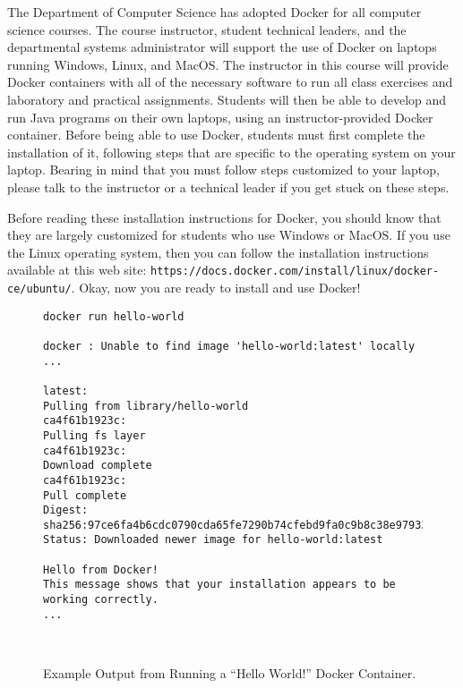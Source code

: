 \documentclass[11pt]{article}
\newcommand{\url}[1]{\lstinline{#1}}
\begin{document}
The Department of Computer Science has adopted Docker for all computer science
courses. The course instructor, student technical leaders, and the departmental
systems administrator will support the use of Docker on laptops running
Windows, Linux, and MacOS. The instructor in this course will provide Docker
containers with all of the necessary software to run all class exercises and
laboratory and practical assignments. Students will then be able to develop and
run Java programs on their own laptops, using an instructor-provided Docker
container. Before being able to use Docker, students must first complete the
installation of it, following steps that are specific to the operating system
on your laptop. Bearing in mind that you must follow steps customized to your
laptop, please talk to the instructor or a technical leader if you get stuck on
these steps.

Before reading these installation instructions for Docker, you should know that
they are largely customized for students who use Windows or MacOS. If you use
the Linux operating system, then you can follow the installation instructions
available at this web site:
\url{https://docs.docker.com/install/linux/docker-ce/ubuntu/}. Okay, now you are
ready to install and use Docker!

\begin{figure}

\begin{verbatim}
docker run hello-world

docker : Unable to find image 'hello-world:latest' locally
...

latest:
Pulling from library/hello-world
ca4f61b1923c:
Pulling fs layer
ca4f61b1923c:
Download complete
ca4f61b1923c:
Pull complete
Digest: sha256:97ce6fa4b6cdc0790cda65fe7290b74cfebd9fa0c9b8c38e979330d547d22ce1
Status: Downloaded newer image for hello-world:latest

Hello from Docker!
This message shows that your installation appears to be working correctly.
...
\end{verbatim}

\vspace*{-.25in}
\caption{Example Output from Running a ``Hello World!''  Docker Container.}~\label{fig:docker}
\vspace*{-.25in}
\end{figure}
\end{document}
